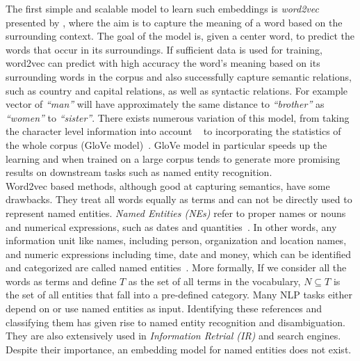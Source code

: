 \noindent
The first simple and scalable model to learn such embeddings is \emph{word2vec} presented by , where the aim is to capture the meaning of a word based on the surrounding context. The goal of the model is, given a center word, to predict the words that occur in its surroundings. If sufficient data is used for training, word2vec can predict with high accuracy the word's meaning based on its surrounding words in the corpus and also successfully capture semantic relations, such as country and capital relations, as well as syntactic relations. For example vector of  \emph{``man''} will have approximately the same distance to  \emph{``brother''} as \emph{``women''} to \emph{``sister''}. There exists numerous variation of this model, from taking the character level information into account ~ to incorporating the statistics of the whole corpus (GloVe model)~. GloVe model in particular speeds up the learning and when trained on a large corpus tends to generate more promising results on downstream tasks such as named entity recognition.\\
Word2vec based methods, although good at capturing semantics, have some drawbacks.  They treat all words equally as terms and can not be directly used to represent named entities. \emph{Named Entities (NEs)} refer to proper names or nouns and numerical
expressions, such as dates and quantities~. In other words, any information unit like names, including person,
organization and location names, and numeric expressions including time, date and money, which can be identified and categorized are called named entities~. More formally, If we consider all the words as terms and define $T$ as the set of all terms in the vocabulary, $N\subseteq T$ is the set of all entities that fall into a pre-defined category. Many NLP tasks either depend on or use named entities as input. Identifying these references and classifying them has given rise to named entity recognition and disambiguation. They are also extensively used in \emph{Information Retrial (IR)} and search engines. Despite their importance, an embedding model for named entities does not exist. \\

